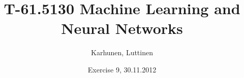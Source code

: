 
\title{T-61.5130 Machine Learning and Neural Networks}
\author{Karhunen, Luttinen}
\date{Exercise 9, 30.11.2012}

\usepackage{pdfpages}

\usepackage{subfig}


\newcommand{\vect}[1]{{\bf{#1}}}
\newcommand{\svect}[1]{\boldsymbol{#1}}
\newcommand{\matr}[1]{\boldsymbol{#1}}

\renewcommand{\vec}[1]{\mathbf{#1}}
\newcommand{\set}[1]{\mathcal{#1}}
\newcommand{\C}{\set{C}}
\newcommand{\E}{\mathcal{E}}
\newcommand{\I}{\vec{I}}
\renewcommand{\L}{\mathcal{L}}
\newcommand{\N}{\mathrm{I \negmedspace N}}
\newcommand{\R}{\mathrm{I \negmedspace R}}
\newcommand{\V}{\set{V}}
\newcommand{\W}{\vec{W}}
\newcommand{\X}{\set{X}}
\newcommand{\e}{\vec{e}}
\newcommand{\h}{\vec{h}}
\newcommand{\m}{\vec{m}}
\newcommand{\mub}{\boldsymbol{\mu}}
\newcommand{\n}{\vec{n}}
\renewcommand{\t}{\vec{t}}
\renewcommand{\u}{\vec{u}}
\renewcommand{\v}{\vec{v}}
\newcommand{\w}{\vec{w}}
\newcommand{\x}{\vec{x}}
\newcommand{\y}{\vec{y}}
\newcommand{\Y}{\vec{Y}}
\newcommand{\z}{\vec{z}}
\newcommand{\argmin}{\operatornamewithlimits{argmin}}
\newcommand{\argmax}{\operatornamewithlimits{argmax}}
\newcommand{\bSigma}{\boldsymbol{\Sigma}}





\maketitle

